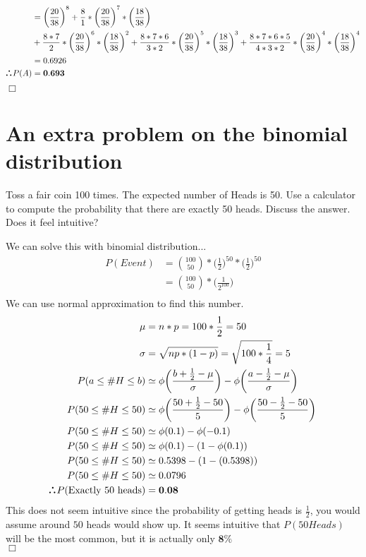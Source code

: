 \documentclass[10pt]{report}
\newenvironment{proof}{\par\noindent{\it Proof.}\hspace*{1em}}{$\Box$\bigskip}
\def\therefore{\boldsymbol{\text{ }
\leavevmode
\lower0.4ex\hbox{$\cdot$}
\kern-.5em\raise0.7ex\hbox{$\cdot$}
\kern-0.6em\lower0.4ex\hbox{$\cdot$}
\thinspace\text{ }}}
\begin{document}
\begin{enumerate}[(a)]
\begin{proof}
\begin{align*}
        &= \bigg(\frac{20}{38}\bigg) ^ {8} +\frac{8}{1} * \bigg(\frac{20}{38}\bigg)^7 * \bigg(\frac{18}{38}\bigg) \\&+ \frac{8*7}{2} * \bigg(\frac{20}{38}\bigg)^6 * \bigg(\frac{18}{38}\bigg)^2 +\frac{8*7*6}{3*2} * \bigg(\frac{20}{38}\bigg)^5 * \bigg(\frac{18}{38}\bigg)^3 + \frac{8*7*6*5}{4*3*2} * \bigg(\frac{20}{38}\bigg)^4 * \bigg(\frac{18}{38}\bigg)^4 \\
        &= 0.6926 \\
        \therefore P(A) &= \mathbf{0.693}
        \end{align*}
        \end{proof}
    \end{enumerate}
    \setcounter{subsection}{6}
        \setcounter{section}{0}
 \section{\sc\color{cit}An extra problem on the binomial distribution}
Toss a fair coin 100 times. The expected number of Heads is 50. Use a calculator to compute the probability that there are exactly 50 heads. Discuss the answer. Does it feel intuitive?
\ \\
\begin{proof}
We can solve this with binomial distribution...
\begin{align*}
P(Event) &= \binom{100}{50} * \bigg(\frac{1}{2}\bigg)^{50} * \bigg(\frac{1}{2}\bigg)^{50} \\
 &= \binom{100}{50} * \bigg(\frac{1}{2^{100}}\bigg) \\
\end{align*}
We can use normal approximation to find this number.
\begin{align*}
\mu &= n*p = 100*\frac{1}{2} = 50\\
\sigma &= \sqrt{np*(1-p)} = \sqrt{100*\frac{1}{4}} = 5\\
P(a \leq \#H \leq b) &\simeq \phi \bigg(\frac{b+\frac{1}{2} - \mu}{\sigma}\bigg) - \phi \bigg(\frac{a-\frac{1}{2} - \mu}{\sigma}\bigg) \\
P(50 \leq \#H \leq 50) &\simeq \phi \bigg(\frac{50+\frac{1}{2} - 50}{5}\bigg) - \phi \bigg(\frac{50-\frac{1}{2} - 50}{5}\bigg) \\
P(50 \leq \#H \leq 50) &\simeq \phi (0.1) - \phi(-0.1) \\
P(50 \leq \#H \leq 50) &\simeq \phi (0.1) - (1-\phi(0.1)) \\
P(50 \leq \#H \leq 50) &\simeq 0.5398 - (1-(0.5398)) \\
P(50 \leq \#H \leq 50) &\simeq 0.0796 \\
\therefore P(\textnormal{Exactly 50 heads}) &= \mathbf{0.08} \\
\end{align*}
This does not seem intuitive since the probability of getting heads is $\frac{1}{2} $, you would assume around $50 $ heads would show up. It seems intuitive that $P(50 Heads) $ will be the most common, but it is actually only $\mathbf{8\%} $ \\
\end{proof}
\end{document}
